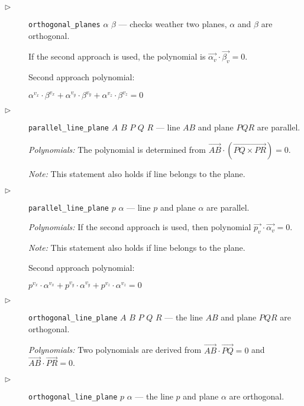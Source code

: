 \documentclass{article}
\begin{document}
\begin{description}
\item[$\triangleright$] {\tt orthogonal\_planes} $\alpha$ $\beta$ ---
  checks weather two planes, $\alpha$ and $\beta$ are orthogonal.


If the second approach is used, the polynomial is
$\overrightarrow{\alpha_v} \cdot \overrightarrow{\beta_v} = 0$.

Second approach polynomial:
\begin{tabbing}
$\alpha^{v_x}\cdot \beta^{v_x} + \alpha^{v_y}\cdot \beta^{v_y} + \alpha^{v_z}\cdot \beta^{v_z} = 0$
\end{tabbing}

\item[$\triangleright$] {\tt parallel\_line\_plane} $A$ $B$ $P$ $Q$ $R$ ---
  line $AB$ and plane $PQR$ are parallel.

  {\em Polynomials:} The polynomial is determined from
  $\overrightarrow{AB} \cdot (\overrightarrow{PQ \times PR}) = 0$.

{\em Note:} This statement also holds if line belongs to the plane.

\item[$\triangleright$] {\tt parallel\_line\_plane} $p$ $\alpha$ ---
  line $p$ and plane $\alpha$ are parallel.

  {\em Polynomials:} If the second approach is used, then polynomial
  $\overrightarrow{p_v} \cdot \overrightarrow{\alpha_v} = 0$.

{\em Note:} This statement also holds if line belongs to the plane.

Second approach polynomial:
\begin{tabbing}
$p^{v_x}\cdot \alpha^{v_x} + p^{v_y}\cdot \alpha^{v_y} + p^{v_z}\cdot \alpha^{v_z} = 0$
\end{tabbing}


\item[$\triangleright$] {\tt orthogonal\_line\_plane} $A$ $B$ $P$ $Q$
  $R$ --- the line $AB$ and plane $PQR$ are orthogonal.

  {\em Polynomials:} Two polynomials are derived from
  $\overrightarrow{AB} \cdot \overrightarrow{PQ} = 0$ and
  $\overrightarrow{AB} \cdot \overrightarrow{PR} = 0$.

\item[$\triangleright$] {\tt orthogonal\_line\_plane} $p$ $\alpha$ ---
  the line $p$ and plane $\alpha$ are orthogonal.


\end{description}
\end{document}

